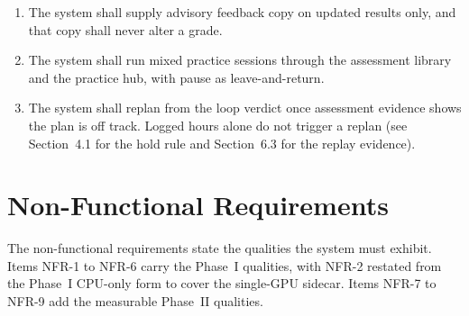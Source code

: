 \begin{enumerate}[label=\textbf{FR-\arabic*},noitemsep,leftmargin=*]
    \item The system shall supply advisory feedback copy on updated results only, and that copy shall never alter a grade.
    \item The system shall run mixed practice sessions through the assessment library and the practice hub, with pause as leave-and-return.
    \item The system shall replan from the loop verdict once assessment evidence shows the plan is off track. Logged hours alone do not trigger a replan (see Section~4.1 for the hold rule and Section~6.3 for the replay evidence).
\end{enumerate}

\section{Non-Functional Requirements}
The non-functional requirements state the qualities the system must exhibit. Items NFR-1 to NFR-6 carry the Phase~I qualities, with NFR-2 restated from the Phase~I CPU-only form to cover the single-GPU sidecar. Items NFR-7 to NFR-9 add the measurable Phase~II qualities.
